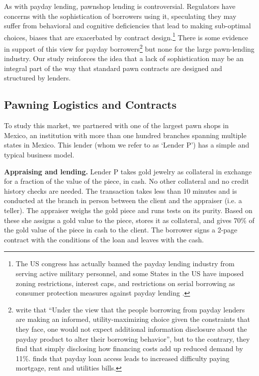 \documentclass[11pt, a4paper]{article}
\begin{document}
As with payday lending, pawnshop lending is controversial. Regulators have concerns with the sophistication of borrowers using it, speculating they may suffer from behavioral and cognitive deficiencies that lead to making sub-optimal choices, biases that are exacerbated by contract design.\footnote{The US congress has actually banned the payday lending industry from serving active military personnel, and some States in the US have imposed zoning restrictions, interest caps, and restrictions on serial borrowing as consumer protection measures against payday lending \citep{Payday}.} There is some evidence in support of this view for payday borrowers\footnote{\cite{Bertrand} write that ``Under the view that the people borrowing from payday lenders are making an informed, utility-maximizing choice given the constraints that they face, one would not expect additional information disclosure about the payday product to alter their borrowing behavior'', but to the contrary, they find that simply disclosing how financing costs add up reduced demand by 11\%. \cite{Meltzer} finds that payday loan access leads to increased difficulty paying mortgage, rent and utilities bills.} but none for the large pawn-lending industry. Our study reinforces the idea that a lack of sophistication may be an integral part of the way that standard pawn contracts are designed and structured by lenders.



\subsection{Pawning Logistics and Contracts}

To study this market, we partnered with one of the largest pawn shops in Mexico, an institution with more than one hundred branches spanning multiple states in Mexico. This lender (whom we refer to as `Lender P') has a simple and typical business model. 

\vspace{.2in}
\noindent \textbf{Appraising and lending.} Lender P takes gold jewelry as collateral in exchange for a fraction of the value of the piece, in cash. No other collateral and no credit history checks are needed. The transaction takes less than 10 minutes and is conducted at the branch in person between the client and the appraiser (i.e. a teller).
The appraiser weighs the gold piece and runs tests on its purity. Based on these she assigns a gold value to the piece, stores it as collateral, and gives 70\% of the gold value of the piece in cash to the client. The borrower signs a 2-page contract with the conditions of the loan and leaves with the cash.
\end{document}

